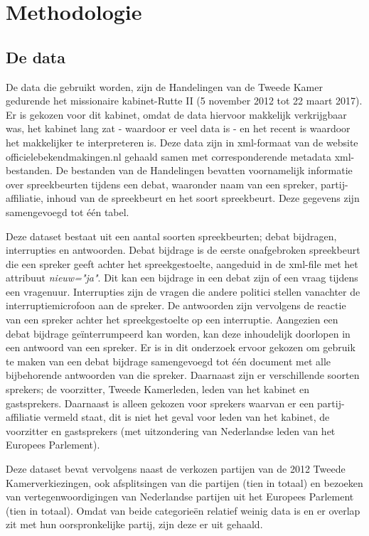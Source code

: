 \section{Methodologie}
\label{sec:meth}


\subsection{De data}
\label{data}
De data die gebruikt worden, zijn de Handelingen van de Tweede Kamer gedurende het missionaire kabinet-Rutte II (5 november 2012 tot 22 maart 2017). Er is gekozen voor dit kabinet, omdat de data hiervoor makkelijk verkrijgbaar was, het kabinet lang zat - waardoor er veel data is - en het recent is waardoor het makkelijker te interpreteren is. Deze data zijn in xml-formaat van de website officielebekendmakingen.nl gehaald samen met corresponderende metadata xml-bestanden. De bestanden van de Handelingen bevatten voornamelijk informatie over spreekbeurten tijdens een debat, waaronder naam van een spreker, partij-affiliatie, inhoud van de spreekbeurt en het soort spreekbeurt. Deze gegevens zijn samengevoegd tot één tabel.\par
Deze dataset bestaat uit een aantal soorten spreekbeurten; debat bijdragen, interrupties en antwoorden. Debat bijdrage is de eerste onafgebroken spreekbeurt die een spreker geeft achter het spreekgestoelte, aangeduid in de xml-file met het attribuut \textit{nieuw="ja"}. Dit kan een bijdrage in een debat zijn of een vraag tijdens een vragenuur. Interrupties zijn de vragen die andere politici stellen vanachter de interruptiemicrofoon aan de spreker. De antwoorden zijn vervolgens de reactie van een spreker achter het spreekgestoelte op een interruptie. Aangezien een debat bijdrage geïnterrumpeerd kan worden, kan deze inhoudelijk doorlopen in een antwoord van een spreker. Er is in dit onderzoek ervoor gekozen om gebruik te maken van een debat bijdrage samengevoegd tot één document met alle bijbehorende antwoorden van die spreker. Daarnaast zijn er verschillende soorten sprekers; de voorzitter, Tweede Kamerleden, leden van het kabinet en gastsprekers.  Daarnaast is alleen gekozen voor sprekers waarvan er een partij-affiliatie vermeld staat, dit is niet het geval voor leden van het kabinet, de voorzitter en gastsprekers  (met uitzondering van Nederlandse leden van het Europees Parlement).\par
Deze dataset bevat vervolgens naast de verkozen partijen van de 2012 Tweede Kamerverkiezingen, ook afsplitsingen van die partijen (tien in totaal) en bezoeken van vertegenwoordigingen van Nederlandse partijen uit het Europees Parlement (tien in totaal). Omdat van beide categorieën relatief weinig data is en er overlap zit met hun oorspronkelijke partij, zijn deze er uit gehaald. \par

